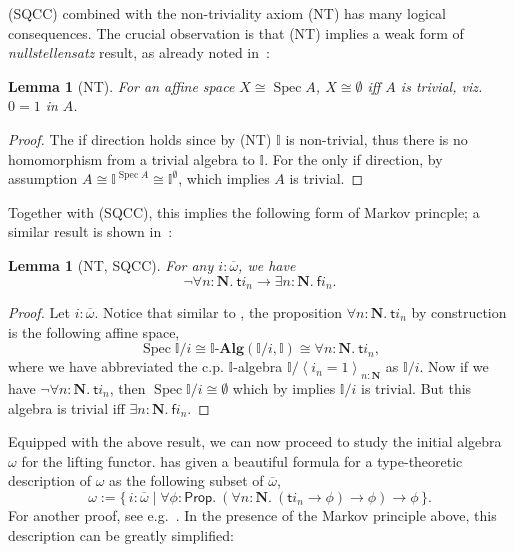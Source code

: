 \documentclass[12pt]{amsart}
\newtheorem{lemma}[theorem]{Lemma}
\theoremstyle{definition}
\newcommand{\mb}[1]{\mathbf{#1}}
\newcommand{\mbb}[1]{\mathbb{#1}}
\newcommand{\I}{\mbb I}
\newcommand{\ms}[1]{\mathsf{#1}}
\newcommand{\alg}{\text{-}\mb{Alg}}
\newcommand{\ov}[1]{\overline{#1}}
\newcommand{\pair}[1]{\left\langle#1\right\rangle}
\newcommand{\scomp}[2]{\{\,#1\mid#2\,\}}
\newcommand{\N}{\mb N}
\newcommand{\fa}[2]{\forall #1\!\colon\!\!#2.\ }
\newcommand{\ex}[2]{\exists #1\!\colon\!\!#2.\ }
\newcommand{\emp}{\emptyset}
\newcommand{\pp}{\ms{Prop}}
\newcommand{\spec}{\operatorname{Spec}}
\begin{document}
(SQCC) combined with the non-triviality axiom (NT) has many logical consequences. The crucial observation is that (NT) implies a weak form of \emph{nullstellensatz} result, as already noted in~\cite{blechschmidt2021using,blechschmidt2020general,Cherubini_Coquand_Hutzler_2024}:

\begin{lemma}[NT]\label{lem:nulls}
  For an affine space $X \cong \spec A$, $X \cong \emp$ iff $A$ is trivial, viz. $0=1$ in $A$.
\end{lemma}
\begin{proof}
  The if direction holds since by (NT) $\I$ is non-trivial, thus there is no homomorphism from a trivial algebra to $\I$. For the only if direction, by assumption $A \cong \I^{\spec A} \cong \I^\emp$, which implies $A$ is trivial. 
\end{proof}

Together with (SQCC), this implies the following form of Markov princple; a similar result is shown in~\cite{cherubini2024foundation}:

\begin{lemma}[NT, SQCC]\label{lem:markov}
  For any $i : \ov\omega$, we have
  \[ \neg\fa{n}{\N}\ms ti_n \to \ex n\N\ms fi_n. \]
\end{lemma}
\begin{proof}
  Let $i : \ov\omega$. Notice that similar to , the proposition $\fa n\N \ms ti_n$ by construction is the following affine space, 
  \[ \spec\I/i \cong \I\alg(\I/i,\I) \cong \fa n\N \ms ti_n, \]
  where we have abbreviated the c.p. $\I$-algebra $\I/\pair{i_n=1}_{n:\N}$ as $\I/i$. Now if we have $\neg\fa n\N \ms ti_n$, then $\spec\I/i \cong \emp$ which by  implies $\I/i$ is trivial. But this algebra is trivial iff $\ex n\N \ms fi_n$.
\end{proof}

Equipped with the above result, we can now proceed to study the initial algebra $\omega$ for the lifting functor. \cite{JIBLADZE1997185} has given a beautiful formula for a type-theoretic description of $\omega$ as the following subset of $\ov\omega$, 
\[ \omega := \scomp{i : \ov\omega}{\fa\phi{\pp} (\fa n{\N} (\ms ti_n \to \phi) \to \phi) \to \phi}. \]
For another proof, see e.g.~\cite{VANOOSTEN2000233}. In the presence of the Markov principle above, this description can be greatly simplified:
\end{document}
